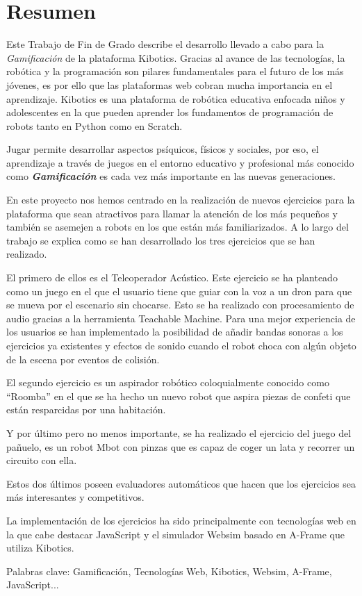 \newpage
\thispagestyle{plain}			%
\setlength{\parskip}{0pt plus 1.0pt}
\section*{Resumen}
Este Trabajo de Fin de Grado describe el desarrollo llevado a cabo para la \textit{Gamificación} de la plataforma Kibotics.  
Gracias al avance de las tecnologías, la robótica y la programación son pilares fundamentales para el futuro de los más jóvenes, es por ello que las plataformas web cobran mucha importancia en el aprendizaje.  Kibotics es una plataforma de robótica educativa enfocada niños y adolescentes en la que pueden aprender los fundamentos de programación de robots tanto en Python como en Scratch. 

Jugar permite desarrollar aspectos psíquicos, físicos y sociales, por eso, el aprendizaje a través de juegos en el entorno educativo y profesional más conocido como \textbf{ \textit{Gamificación} } es cada vez más importante en las nuevas generaciones.
 
En este proyecto nos hemos centrado en la realización de nuevos ejercicios para la plataforma que sean atractivos para llamar la atención de los más pequeños y también se asemejen a robots en los que están más familiarizados.  A lo largo del trabajo se explica como se han desarrollado los tres ejercicios que se han realizado.

 El primero de ellos es el Teleoperador Acústico. Este ejercicio se ha planteado como un juego en el que el usuario tiene que guiar con la voz a un dron para que se mueva por el escenario sin chocarse. Esto se ha realizado con procesamiento de audio gracias a la herramienta Teachable Machine.
Para una mejor experiencia de los usuarios se han implementado la posibilidad de añadir bandas sonoras a los ejercicios ya existentes y  efectos de sonido cuando el robot choca con algún objeto de la escena por eventos de colisión.

El segundo ejercicio es un aspirador robótico coloquialmente conocido como ``Roomba'' en el que se ha hecho un nuevo robot que aspira piezas de confeti que están resparcidas por una habitación. 

Y por último pero no menos importante, se ha realizado el ejercicio del juego del pañuelo, es un robot  Mbot con pinzas que es capaz de coger un lata y recorrer un circuito con ella. 

Estos dos últimos poseen evaluadores automáticos que hacen que los ejercicios sea más interesantes y competitivos.
 
La implementación de los ejercicios ha sido principalmente con tecnologías web en la que cabe destacar JavaScript y el simulador Websim basado en A-Frame que utiliza Kibotics.

\vfill
Palabras clave: Gamificación, Tecnologías Web, Kibotics, Websim, A-Frame, JavaScript...


